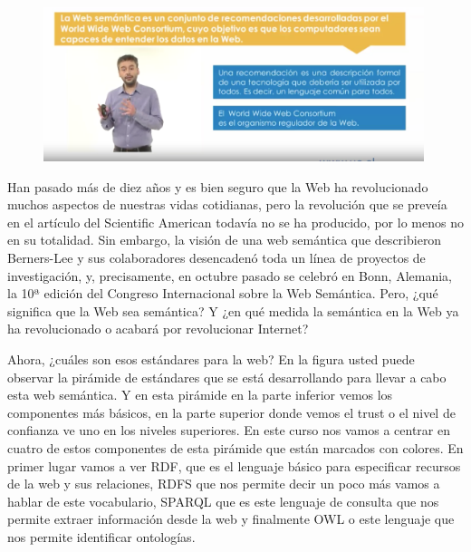 \begin{figure}[H]
	\centering
	\includegraphics[height=4.5cm]{imagenes/capitulo3/8}
	\caption{}
\end{figure}

Han pasado más de diez años y es bien seguro que la Web ha revolucionado muchos aspectos de nuestras vidas cotidianas, pero la revolución que se preveía en el artículo del Scientific American todavía no se ha producido, por lo menos no en su totalidad. Sin embargo, la visión de una web semántica que describieron Berners-Lee y sus colaboradores desencadenó toda un línea de proyectos de investigación, y, precisamente, en octubre pasado se celebró en Bonn, Alemania, la 10ª edición del Congreso Internacional sobre la Web Semántica. Pero, ¿qué significa que la Web sea semántica? Y ¿en qué medida la semántica en la Web ya ha revolucionado o acabará por revolucionar Internet? %

Ahora, ¿cuáles son esos estándares para la web? En la figura usted puede observar la pirámide de estándares que se está desarrollando para llevar a cabo esta web semántica. Y en esta pirámide en la parte inferior vemos los componentes más básicos, en la parte superior donde vemos el trust o el nivel de confianza ve uno en los niveles superiores. En este curso nos vamos a centrar en cuatro de estos componentes de esta pirámide que están marcados con colores. En primer lugar vamos a ver RDF, que es el lenguaje básico para especificar recursos de la web y sus relaciones, RDFS que nos permite decir un poco más vamos a hablar de este vocabulario, SPARQL que es este lenguaje de consulta que nos permite extraer información desde la web y finalmente OWL o este lenguaje que nos permite identificar ontologías.


